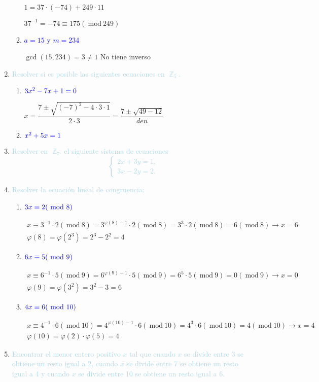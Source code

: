 \documentclass[12pt]{article}
\newcommand{\lb}[1]{\textcolor{lightblue}{#1}}
\newcommand{\db}[1]{\textcolor{blue}{#1}}
\DeclareMathOperator{\Z}{\mathbb{Z}}
\renewcommand{\mod}{~\mathrm{mod}~}
\begin{document}
\begin{enumerate}[label=\color{red}\textbf{\arabic*)}, leftmargin=*]
\begin{enumerate}[label=\color{red}\alph*)]
        $1=37\cdot(-74)+249\cdot11$
        
        $37^{-1}=-74\equiv175(\mod249)$
		\item \db{$a=15$ y $m=234$}
        
        $\gcd(15,234)=3\neq1$ No tiene inverso
	\end{enumerate}
	\item \lb{Resolver si es posible las siguientes ecuaciones en $\Z_5$.}
	\begin{enumerate}[label=\color{red}\alph*)]
		\item $\db{3x^2-7x+1=0}$
        
        $x=\dfrac{7\pm\sqrt{(-7)^2-4\cdot3\cdot1}}{2\cdot3}=\dfrac{7\pm\sqrt{49-12}}{den}$
		\item $\db{x^2+5x=1}$
	\end{enumerate}
	
	\item \lb{Resolver en $\Z_7$ el siguiente sistema de ecuaciones \[ \begin{cases}
			2x+3y=1,\\
			3x-2y=2.
		\end{cases} \]}
	\item \lb{Resolver la ecuación lineal de congruencia:}
	\begin{enumerate}[label=\color{red}\alph*)]
		\item $\db{3x\equiv2(\mod 8)}$
		
		$\begin{array}{l}
			x\equiv3^{-1}\cdot2(\mod8)=3^{\varphi(8)-1}\cdot2(\mod8)=3^3\cdot2(\mod8)=6(\mod8)\longrightarrow x=6\\
			\varphi(8)=\varphi(2^3)=2^3-2^2=4
		\end{array}$
		
		\item $\db{6x\equiv 5(\mod 9)}$
		
		$\begin{array}{l}
			x\equiv6^{-1}\cdot5(\mod9)=6^{\varphi(9)-1}\cdot5(\mod9)=6^5\cdot5(\mod9)=0(\mod9)\longrightarrow x=0\\
			\varphi(9)=\varphi(3^2)=3^2-3=6
		\end{array}$
		\item $\db{4x\equiv6(\mod 10)}$
		
		$\begin{array}{l}
			x\equiv4^{-1}\cdot6(\mod10)=4^{\varphi(10)-1}\cdot6(\mod10)=4^3\cdot6(\mod10)=4(\mod10)\longrightarrow x=4\\
			\varphi(10)=\varphi(2)\cdot\varphi(5)=4
		\end{array}$
	\end{enumerate}
	\item \lb{Encontrar el menor entero positivo $x$ tal que cuando $x$ se divide entre 3 se obtiene un resto igual a 2, cuando $x$ se divide entre 7 se obtiene un resto igual a 4 y cuando $x$ se divide entre 10 se obtiene un resto igual a 6.}
    

\end{enumerate}
\end{document}
